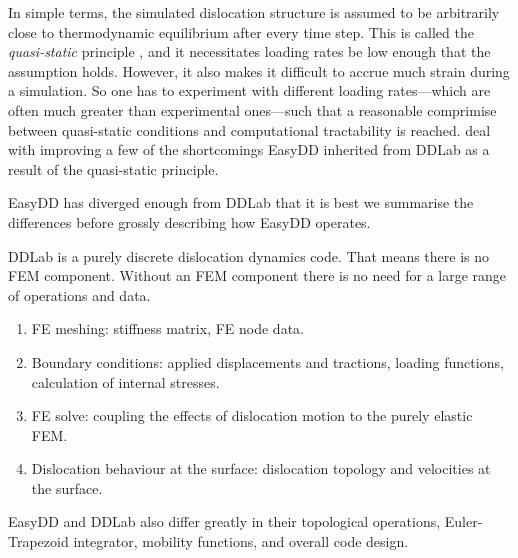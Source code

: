 In simple terms, the simulated dislocation structure is assumed to be arbitrarily close to thermodynamic equilibrium after every time step. This is called the \emph{quasi-static} principle \cite{ddlab,arsenlis2007enabling}, and it necessitates loading rates be low enough that the assumption holds. However, it also makes it difficult to accrue much strain during a simulation. So one has to experiment with different loading rates---which are often much greater than experimental ones---such that a reasonable comprimise between quasi-static conditions and computational tractability is reached.  deal with improving a few of the shortcomings EasyDD inherited from DDLab as a result of the quasi-static principle.

EasyDD has diverged enough from DDLab that it is best we summarise the differences before grossly describing how EasyDD operates.

DDLab is a purely discrete dislocation dynamics code. That means there is no FEM component. Without an FEM component there is no need for a large range of operations and data.
\begin{enumerate}
    \item FE meshing: stiffness matrix, FE node data.
    \item Boundary conditions: applied displacements and tractions, loading functions, calculation of internal stresses.
    \item FE solve: coupling the effects of dislocation motion to the purely elastic FEM.
    \item Dislocation behaviour at the surface: dislocation topology and velocities at the surface.
\end{enumerate}
EasyDD and DDLab also differ greatly in their topological operations, Euler-Trapezoid integrator, mobility functions, and overall code design.

